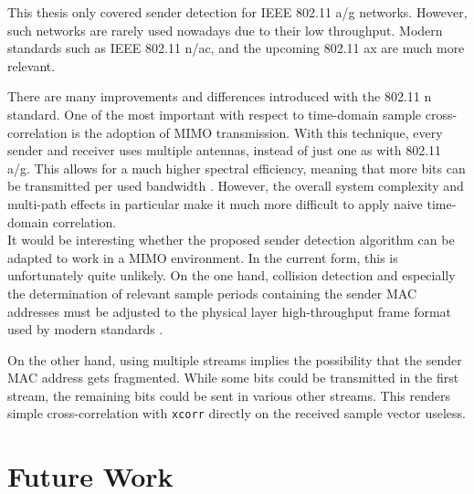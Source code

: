 This thesis only covered sender detection for IEEE 802.11 a/g networks. However, such networks are rarely used nowadays due to their low throughput. Modern standards such as IEEE 802.11 n/ac, and the upcoming 802.11 ax are much more relevant.

There are many improvements and differences introduced with the 802.11 n standard. One of the most important with respect to time-domain sample cross-correlation is the adoption of \gls{MIMO} transmission. With this technique, every sender and receiver uses multiple antennas, instead of just one as with 802.11 a/g. This allows for a much higher spectral efficiency, meaning that more bits can be transmitted per used bandwidth \cite{NEEDED}. However, the overall system complexity and multi-path effects in particular make it much more difficult to apply naive time-domain correlation.\\

It would be interesting whether the proposed sender detection algorithm can be adapted to work in a \gls{MIMO} environment. In the current form, this is unfortunately quite unlikely. On the one hand, collision detection and especially the determination of relevant sample periods containing the sender MAC addresses must be adjusted to the physical layer high-throughput frame format used by modern standards \cite{ieee2012}.

On the other hand, using multiple streams implies the possibility that the sender MAC address gets fragmented. While some bits could be transmitted in the first stream, the remaining bits could be sent in various other streams. This renders simple cross-correlation with \texttt{xcorr} directly on the received sample vector useless.



\section{Future Work}
